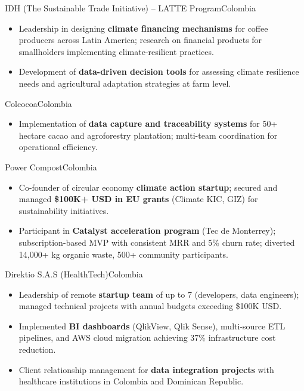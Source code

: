 \documentclass[11pt,a4paper,sans]{moderncv}
\begin{document}
%
{IDH (The Sustainable Trade Initiative) -- LATTE Program}{Colombia}{}{%
\begin{itemize}
  \item Leadership in designing \textbf{climate financing mechanisms} for coffee producers
        across Latin America; research on financial products for smallholders implementing
        climate-resilient practices.
  \item Development of \textbf{data-driven decision tools} for assessing climate resilience
        needs and agricultural adaptation strategies at farm level.
\end{itemize}}

%
{Colcocoa}{Colombia}{}{%
\begin{itemize}
  \item Implementation of \textbf{data capture and traceability systems} for 50+ hectare
        cacao and agroforestry plantation; multi-team coordination for operational efficiency.
\end{itemize}}

%
{Power Compost}{Colombia}{}{%
\begin{itemize}
  \item Co-founder of circular economy \textbf{climate action startup}; secured and managed
        \textbf{\$100K+ USD in EU grants} (Climate KIC, GIZ) for sustainability initiatives.
  \item Participant in \textbf{Catalyst acceleration program} (Tec de Monterrey);
        subscription-based MVP with consistent MRR and 5\% churn rate; diverted
        14,000+ kg organic waste, 500+ community participants.
\end{itemize}}

%
{Direktio S.A.S (HealthTech)}{Colombia}{}{%
\begin{itemize}
  \item Leadership of remote \textbf{startup team} of up to 7 (developers, data engineers);
        managed technical projects with annual budgets exceeding \$100K USD.
  \item Implemented \textbf{BI dashboards} (QlikView, Qlik Sense), multi-source ETL
        pipelines, and AWS cloud migration achieving 37\% infrastructure cost reduction.
  \item Client relationship management for \textbf{data integration projects} with
        healthcare institutions in Colombia and Dominican Republic.
\end{itemize}}
\end{document}
